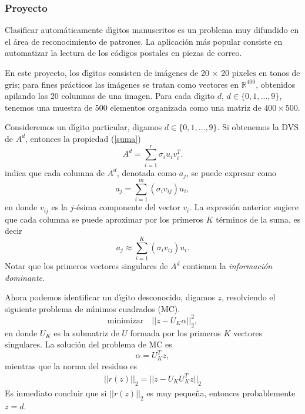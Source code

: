 \documentclass[12pt]{article}
\newcommand{\real}{\mathbb{R}}
\begin{document}
\subsubsection*{Proyecto}
  

Clasificar autom\'aticamente d\'{\i}gitos manuscritos es un problema muy difundido en el \'area de reconocimiento de patrones. La aplicaci\'on m\'as popular consiste en
automatizar la lectura de los c\'odigos postales en piezas de correo. 

 En este proyecto, los d\'{\i}gitos consisten de im\'agenes de 20 $\times$ 20 pixeles en tonos de gris; para fines pr\'acticos las im\'agenes se tratan como vectores en $\real^{400}$, obtenidos apilando las 20 columnas de una imagen.  Para cada d\'{\i}gito $d$,  $d \in \{0,1, \ldots, 9\}$, tenemos una muestra de 500 elementos organizada como una matriz de $400 \times 500$.
 
%
%
Consideremos un d\'{\i}gito particular, digamos $d \in \{0,1, \ldots, 9\}$. Si obtenemos la DVS de $A^d$, entonces la propiedad (\ref{suma}) 
         \[
            A^d = \sum_{i=1}^r \sigma_i u_i v_i^T.
         \]
indica que cada columna de $A^d$, denotada como $a_j$,  se puede expresar como
\[
      a_j = \sum_{i=1}^m (\sigma_i v_{ij}) u_i,
\]
en donde $v_{ij}$ es la $j$-\'esima componente del vector $v_i$. La expresi\'on anterior sugiere que cada columna se puede aproximar por los primeros $K$ t\'erminos de la suma, es decir
\[
       a_j \approx \sum_{i=1}^K (\sigma_i v_{ij}) u_i.
\]
Notar que los primeros vectores singulares de $A^d$ contienen la {\em informaci\'on dominante}. 

Ahora podemos identificar un d\'{\i}gito desconocido, digamos $z$, resolviendo el siguiente problema de m\'{\i}nimos cuadrados (MC).
\[
    \mbox{minimizar}  \quad || z - U_K \alpha ||_2^2,
\]
en donde $U_K$ es la submatriz de $U$ formada por los primeros $K$ vectores singulares. La soluci\'on del problema de MC es 
\[
    \alpha = U_K^Tz,
\]
mientras que la norma del residuo es 
\begin{eqnarray}  \label{MC}
  ||r(z)||_2 = || z - U_KU_K^Tz||_2
\end{eqnarray}
 Es inmediato concluir que si $||r(z)||_2$ es muy peque\~na, entonces probablemente $z = d$.
\end{document}
